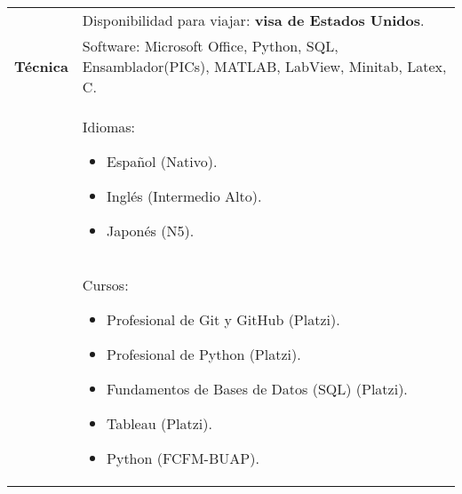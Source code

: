 \documentclass[twoside,letter,openright,10pt]{report}
\begin{document}
\begin{table}[hbt!]
\begin{tabular}{p{40mm}p{140mm}}
\\
& Disponibilidad para viajar: \textbf{visa de Estados Unidos}.
\\
\textbf{Técnica}
& Software: Microsoft Office, Python, SQL, Ensamblador(PICs), MATLAB, LabView, Minitab, Latex, C.
\\
& Idiomas:
\begin{itemize}[noitemsep,nolistsep]
\item Español (Nativo).
\item Inglés (Intermedio Alto).
\item Japonés (N5).
\vspace{-4mm}
\end{itemize}
\\
& Cursos:
\begin{itemize}[noitemsep,nolistsep]
\item Profesional de Git y GitHub (Platzi).
\item Profesional de Python (Platzi).
\item Fundamentos de Bases de Datos (SQL) (Platzi).
\item Tableau (Platzi).
\item Python (FCFM-BUAP).
\vspace{-4mm}
\end{itemize}
\end{tabular}
\end{table}
\end{document}
